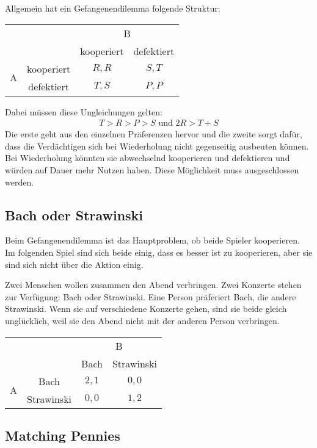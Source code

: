 Allgemein hat ein Gefangenendilemma folgende Struktur:
\begin{center}
  \begin{tabular}{cccc}
    & & \multicolumn{2}{c}{B}\\
    & & kooperiert & defektiert\\
    \multirow{2}{*}{A} &
    kooperiert & $R, R$ & $S, T$\\
    & defektiert & $T, S$ & $P, P$\\
  \end{tabular}
\end{center}
Dabei müssen diese Ungleichungen gelten:
\begin{align*}
  T > R > P > S \text{ und } 2R > T + S
\end{align*}
Die erste geht aus den einzelnen Präferenzen hervor und die zweite sorgt dafür, dass die
Verdächtigen sich bei Wiederholung nicht gegenseitig ausbeuten können.
Bei Wiederholung könnten sie abwechselnd kooperieren und defektieren und würden auf Dauer
mehr Nutzen haben.
Diese Möglichkeit muss ausgeschlossen werden.

\subsection{Bach oder Strawinski}%
\label{sub:bach_oder_strawinski}

Beim Gefangenendilemma ist das Hauptproblem, ob beide Spieler kooperieren.
Im folgenden Spiel sind sich beide einig, dass es besser ist zu kooperieren, aber sie sind
sich nicht über die Aktion einig.

Zwei Menschen wollen zusammen den Abend verbringen.
Zwei Konzerte stehen zur Verfügung: Bach oder Strawinski.
Eine Person präferiert Bach, die andere Strawinski.
Wenn sie auf verschiedene Konzerte gehen, sind sie beide gleich unglücklich, weil sie den
Abend nicht mit der anderen Person verbringen.
\begin{center}
  \begin{tabular}{cccc}
    & & \multicolumn{2}{c}{B}\\
    & & Bach & Strawinski\\
    \multirow{2}{*}{A} &
    Bach & $2, 1$ & $0, 0$\\
    & Strawinski & $0, 0$ & $1, 2$\\
  \end{tabular}
\end{center}

\subsection{Matching Pennies}%
\label{sub:matching_pennies}

